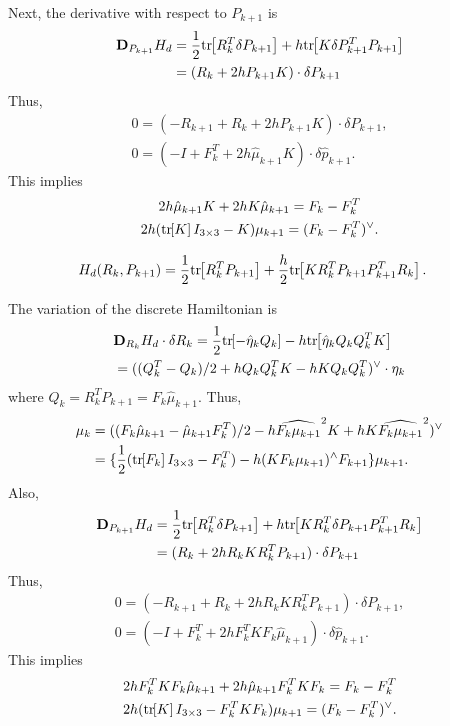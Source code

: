 \documentclass[letterpaper, 10pt, conference]{ieeeconf}
\newcommand{\bracket}[1]{\ensuremath{\left[ #1 \right]}}
\newcommand{\tr}[1]{\mbox{tr}\ensuremath{\negthickspace\bracket{#1}}}
\newcommand{\D}{\ensuremath{\mathbf{D}}}
\begin{document}
Next, the derivative with respect to $P_{k+1}$ is 
\begin{align*}
    \D_{P_{k+1}} H_d & = \frac{1}{2}\tr{ R_k^T \delta P_{k+1}} + h\tr{K \delta P_{k+1}^T P_{k+1} } \\
                     & = ( R_k + 2h P_{k+1}K ) \cdot \delta P_{k+1}
\end{align*}
Thus, 
\begin{gather*}
0 = (- R_{k+1} +  R_k + 2h P_{k+1}K ) \cdot \delta P_{k+1},\\
0 = (- I +  F_k^T + 2h \hat\mu_{k+1} K ) \cdot \delta \hat p_{k+1}.
\end{gather*}
This implies
\begin{gather}
    2h \hat\mu_{k+1} K + 2h K \hat\mu_{k+1} = F_k - F_k^T\nonumber\\
2h (\tr{K}I_{3\times 3} - K )\mu_{k+1} = (F_k- F_k^T)^\vee.
\end{gather}


\begin{align*}
    H_d (R_k, P_{k+1}) 
    & = \frac{1}{2}\tr{R_k^T P_{k+1}}   + \frac{h}{2} \tr{ K R_k^T P_{k+1} P_{k+1}^T R_k }.
\end{align*}

The variation of the discrete Hamiltonian is
\begin{align*}
    & \D_{R_k} H_d \cdot \delta R_k =\frac{1}{2} \tr{-\hat\eta_k Q_k} - h \tr{\hat\eta_k Q_kQ_k^T K } \\
    & = ( (Q_k^T- Q_k)/2 +h Q_kQ_k^TK  - hK Q_k Q_k^T)^\vee\cdot \eta_k
\end{align*}
where $Q_k = R_k^T P_{k+1} = F_k \hat\mu_{k+1}$.
Thus,
\begin{align}
    \mu_k 
          & = ((F_k\hat\mu_{k+1}-\hat\mu_{k+1}F_k^T)/2 - h \widehat{F_k\mu_{k+1}}^2 K +  h K \widehat{F_k\mu_{k+1}}^2)^\vee\nonumber \\
          & = \{ \frac{1}{2}(\tr{F_k}I_{3\times 3}-F_k^T) -h (KF_k\mu_{k+1})^\wedge F_{k+1}  \}  \mu_{k+1}.
\end{align}
Also,
\begin{align*}
    \D_{P_{k+1}} H_d & = \frac{1}{2}\tr{ R_k^T \delta P_{k+1}} + h\tr{KR_k^T \delta P_{k+1} P_{k+1}^T R_k} \\
                     & = ( R_k + 2h R_k K R_k^T P_{k+1}) \cdot \delta P_{k+1}
\end{align*}
Thus, 
\begin{gather*}
0 = (- R_{k+1} +  R_k + 2h R_k K R_k^T P_{k+1}) \cdot \delta P_{k+1},\\
0 = (- I +  F_k^T + 2h F_k^T K F_k \hat\mu_{k+1}) \cdot \delta \hat p_{k+1}.
\end{gather*}
This implies
\begin{gather}
2h F_k^T K F_k \hat\mu_{k+1} + 2h \hat\mu_{k+1} F_k^T K F_k = F_k - F_k^T\nonumber\\
2h (\tr{K}I_{3\times 3} - F_k^T K F_k)\mu_{k+1} = (F_k- F_k^T)^\vee.
\end{gather}
\end{document}
